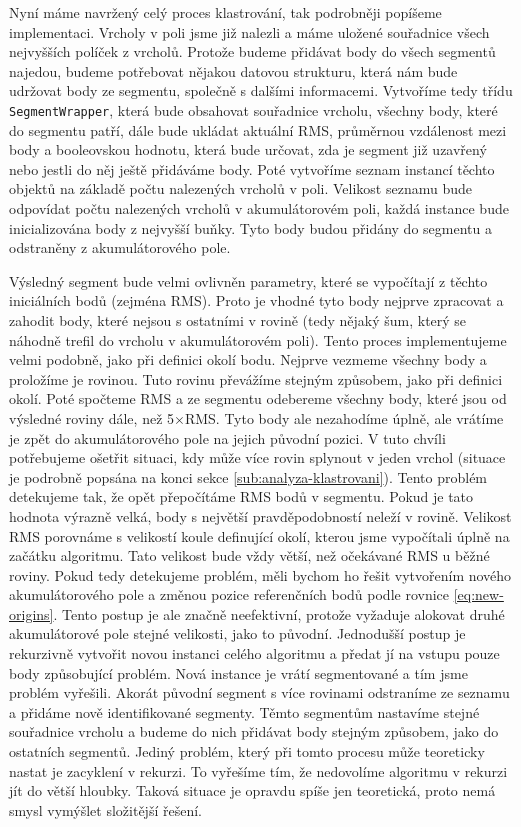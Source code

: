 \documentclass[11pt,twoside,a4paper]{book}
\begin{document}
Nyní máme navržený celý proces klastrování, tak podrobněji popíšeme implementaci. Vrcholy v poli jsme již nalezli a máme uložené souřadnice všech nejvyšších políček z vrcholů. Protože budeme přidávat body do všech segmentů najedou, budeme potřebovat nějakou datovou strukturu, která nám bude udržovat body ze segmentu, společně s dalšími informacemi. Vytvoříme tedy třídu \verb|SegmentWrapper|, která bude obsahovat souřadnice vrcholu, všechny body, které do segmentu patří, dále bude ukládat aktuální RMS, průměrnou vzdálenost mezi body a booleovskou hodnotu, která bude určovat, zda je segment již uzavřený nebo jestli do něj ještě přidáváme body. Poté vytvoříme seznam instancí těchto objektů na základě počtu nalezených vrcholů v poli. Velikost seznamu bude odpovídat počtu nalezených vrcholů v akumulátorovém poli, každá instance bude inicializována body z nejvyšší buňky. Tyto body budou přidány do segmentu a odstraněny z akumulátorového pole.

Výsledný segment bude velmi ovlivněn parametry, které se vypočítají z těchto iniciálních bodů (zejména RMS). Proto je vhodné tyto body nejprve zpracovat a zahodit body, které nejsou s ostatními v rovině (tedy nějaký šum, který se náhodně trefil do vrcholu v akumulátorovém poli). Tento proces implementujeme velmi podobně, jako při definici okolí bodu. Nejprve vezmeme všechny body a proložíme je rovinou. Tuto rovinu převážíme stejným způsobem, jako při definici okolí. Poté spočteme RMS a ze segmentu odebereme všechny body, které jsou od výsledné roviny dále, než 5$\times$RMS. Tyto body ale nezahodíme úplně, ale vrátíme je zpět do akumulátorového pole na jejich původní pozici. V tuto chvíli potřebujeme ošetřit situaci, kdy může více rovin splynout v jeden vrchol (situace je podrobně popsána na konci sekce \ref{sub:analyza-klastrovani}). Tento problém detekujeme tak, že opět přepočítáme RMS bodů v segmentu. Pokud je tato hodnota výrazně velká, body s největší pravděpodobností neleží v rovině. Velikost RMS porovnáme s velikostí koule definující okolí, kterou jsme vypočítali úplně na začátku algoritmu. Tato velikost bude vždy větší, než očekávané RMS u běžné roviny. Pokud tedy detekujeme problém, měli bychom ho řešit vytvořením nového akumulátorového pole a změnou pozice referenčních bodů podle rovnice \ref{eq:new-origins}. Tento postup je ale značně neefektivní, protože vyžaduje alokovat druhé akumulátorové pole stejné velikosti, jako to původní. Jednodušší postup je rekurzivně vytvořit novou instanci celého algoritmu a předat jí na vstupu pouze body způsobující problém. Nová instance je vrátí segmentované a tím jsme problém vyřešili. Akorát původní segment s více rovinami odstraníme ze seznamu a přidáme nově identifikované segmenty. Těmto segmentům nastavíme stejné souřadnice vrcholu a budeme do nich přidávat body stejným způsobem, jako do ostatních segmentů. Jediný problém, který při tomto procesu může teoreticky nastat je zacyklení v rekurzi. To vyřešíme tím, že nedovolíme algoritmu v rekurzi jít do větší hloubky. Taková situace je opravdu spíše jen teoretická, proto nemá smysl vymýšlet složitější řešení.
\end{document}
